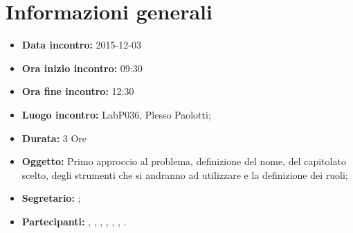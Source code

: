 \newpage
\section{Informazioni generali}
\begin{itemize}
\item \textbf{Data incontro:} 2015-12-03
\item \textbf{Ora inizio incontro:} 09:30
\item \textbf{Ora fine incontro:} 12:30
\item \textbf{Luogo incontro:} LabP036, Plesso Paolotti;
\item \textbf{Durata:} 3 Ore
\item \textbf{Oggetto:} Primo approccio al problema, definizione del nome, del capitolato scelto, degli strumenti che si andranno ad utilizzare e la definizione dei ruoli;
\item \textbf{Segretario:} \AF;
\item \textbf{Partecipanti:} \AF, \FB, \GN, \GR, \MV, \MP, \SM.

\end{itemize}
